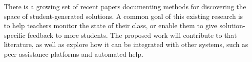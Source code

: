 \documentclass[12pt]{article}
\begin{document}
There is a growing set of recent papers documenting methods for discovering the space of student-generated solutions. A common goal of this existing research is to help teachers monitor the state of their class, or enable them to give solution-specific feedback to more students. The proposed work will contribute to that literature, as well as explore how it can be integrated with other systems, such as peer-assistance platforms and automated help.


%

\end{document}
